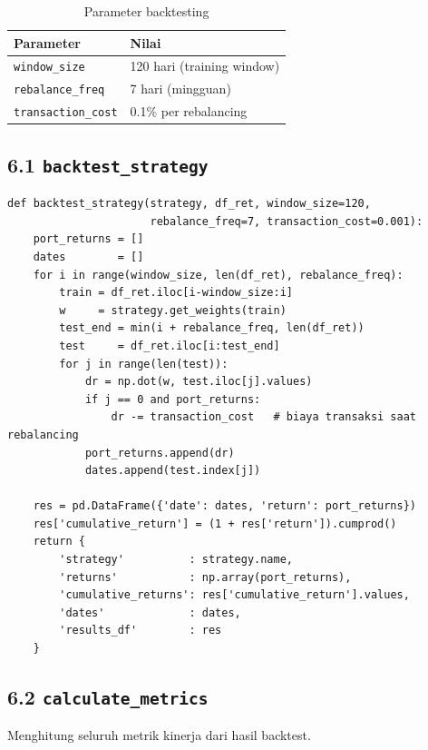 \documentclass[12pt,a4paper]{article}
\begin{document}
\begin{table}[h!]
\centering
\begin{tabular}{ll}
\toprule
Parameter & Nilai \\
\midrule
\texttt{window\_size} & 120 hari (training window) \\
\texttt{rebalance\_freq} & 7 hari (mingguan) \\
\texttt{transaction\_cost} & 0.1\% per rebalancing \\
\bottomrule
\end{tabular}
\caption{Parameter backtesting}
\end{table}

\subsection{6.1 \texttt{backtest\_strategy}}

\begin{lstlisting}[caption={\texttt{backtest\_strategy}}]
def backtest_strategy(strategy, df_ret, window_size=120,
                      rebalance_freq=7, transaction_cost=0.001):
    port_returns = []
    dates        = []
    for i in range(window_size, len(df_ret), rebalance_freq):
        train = df_ret.iloc[i-window_size:i]
        w     = strategy.get_weights(train)
        test_end = min(i + rebalance_freq, len(df_ret))
        test     = df_ret.iloc[i:test_end]
        for j in range(len(test)):
            dr = np.dot(w, test.iloc[j].values)
            if j == 0 and port_returns:
                dr -= transaction_cost   # biaya transaksi saat rebalancing
            port_returns.append(dr)
            dates.append(test.index[j])

    res = pd.DataFrame({'date': dates, 'return': port_returns})
    res['cumulative_return'] = (1 + res['return']).cumprod()
    return {
        'strategy'          : strategy.name,
        'returns'           : np.array(port_returns),
        'cumulative_returns': res['cumulative_return'].values,
        'dates'             : dates,
        'results_df'        : res
    }
\end{lstlisting}

\subsection{6.2 \texttt{calculate\_metrics}}
Menghitung seluruh metrik kinerja dari hasil backtest.
\end{document}
